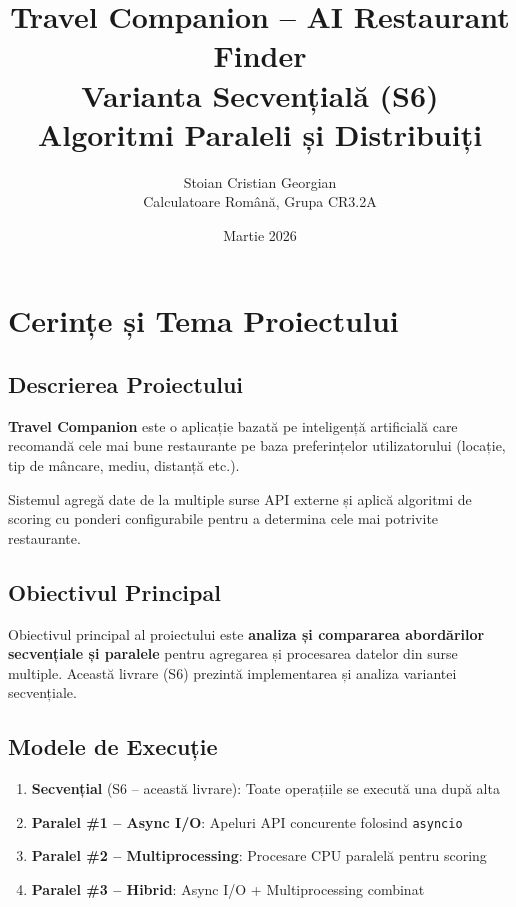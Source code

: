 \documentclass[12pt,a4paper]{article}
\title{
    \textbf{Travel Companion -- AI Restaurant Finder}\\[0.5em]
    \large Varianta Secvențială (S6)\\[0.3em]
    \large Algoritmi Paraleli și Distribuiți
}
\author{
    Stoian Cristian Georgian\\
    Calculatoare Română, Grupa CR3.2A
}
\date{Martie 2026}
\begin{document}
\maketitle

\tableofcontents
\newpage

\section{Cerințe și Tema Proiectului}

\subsection{Descrierea Proiectului}

\textbf{Travel Companion} este o aplicație bazată pe inteligență artificială care recomandă cele mai bune restaurante pe baza preferințelor utilizatorului (locație, tip de mâncare, mediu, distanță etc.).

Sistemul agregă date de la multiple surse API externe și aplică algoritmi de scoring cu ponderi configurabile pentru a determina cele mai potrivite restaurante.

\subsection{Obiectivul Principal}

Obiectivul principal al proiectului este \textbf{analiza și compararea abordărilor secvențiale și paralele} pentru agregarea și procesarea datelor din surse multiple. Această livrare (S6) prezintă implementarea și analiza variantei secvențiale.

\subsection{Modele de Execuție}

\begin{enumerate}
    \item \textbf{Secvențial} (S6 -- această livrare): Toate operațiile se execută una după alta
    \item \textbf{Paralel \#1 -- Async I/O}: Apeluri API concurente folosind \texttt{asyncio}
    \item \textbf{Paralel \#2 -- Multiprocessing}: Procesare CPU paralelă pentru scoring
    \item \textbf{Paralel \#3 -- Hibrid}: Async I/O + Multiprocessing combinat
\end{enumerate}
\end{document}
